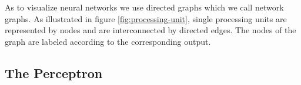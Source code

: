 As to visualize neural networks we use directed graphs which we call network graphs. As illustrated in figure \ref{fig:processing-unit}, single processing units are represented by nodes and are interconnected by directed edges. The nodes of the graph are labeled according to the corresponding output.

%
%
%

\subsection{The Perceptron}
\label{subsec:perceptron}


